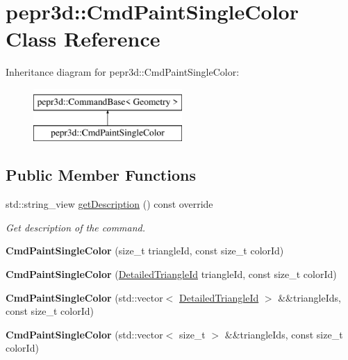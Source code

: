 \hypertarget{classpepr3d_1_1_cmd_paint_single_color}{}\section{pepr3d\+::Cmd\+Paint\+Single\+Color Class Reference}
\label{classpepr3d_1_1_cmd_paint_single_color}
Inheritance diagram for pepr3d\+::Cmd\+Paint\+Single\+Color\+:\begin{figure}[H]
\begin{center}
\leavevmode
\includegraphics[height=2.000000cm]{classpepr3d_1_1_cmd_paint_single_color}
\end{center}
\end{figure}
\subsection*{Public Member Functions}
\begin{DoxyCompactItemize}
\item 
\mbox{\label{classpepr3d_1_1_cmd_paint_single_color_a7abd306f996257ff738b0ffdb278ca0a}} 
std\+::string\+\_\+view \mbox{\hyperlink{classpepr3d_1_1_cmd_paint_single_color_a7abd306f996257ff738b0ffdb278ca0a}{get\+Description}} () const override
\begin{DoxyCompactList}\small\item\em Get description of the command. \end{DoxyCompactList}\item 
\mbox{\label{classpepr3d_1_1_cmd_paint_single_color_a9395fff6681c03f0e73348ee3771173e}} 
{\bfseries Cmd\+Paint\+Single\+Color} (size\+\_\+t triangle\+Id, const size\+\_\+t color\+Id)
\item 
\mbox{\label{classpepr3d_1_1_cmd_paint_single_color_a9c8d4ac95c5b65c02a75ca2f1e66191e}} 
{\bfseries Cmd\+Paint\+Single\+Color} (\mbox{\hyperlink{structpepr3d_1_1_detailed_triangle_id}{Detailed\+Triangle\+Id}} triangle\+Id, const size\+\_\+t color\+Id)
\item 
\mbox{\label{classpepr3d_1_1_cmd_paint_single_color_a80de132d4862eb3b1f9af0b8dc35c3a9}} 
{\bfseries Cmd\+Paint\+Single\+Color} (std\+::vector$<$ \mbox{\hyperlink{structpepr3d_1_1_detailed_triangle_id}{Detailed\+Triangle\+Id}} $>$ \&\&triangle\+Ids, const size\+\_\+t color\+Id)
\item 
\mbox{\label{classpepr3d_1_1_cmd_paint_single_color_ad8c2b3b0d9c7d50b63130ce7e7400125}} 
{\bfseries Cmd\+Paint\+Single\+Color} (std\+::vector$<$ size\+\_\+t $>$ \&\&triangle\+Ids, const size\+\_\+t color\+Id)
\end{DoxyCompactItemize}
